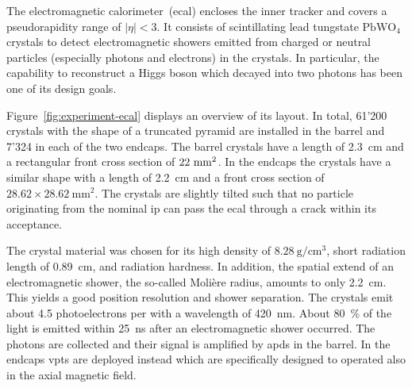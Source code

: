 The electromagnetic calorimeter~(\gls{ecal}) encloses the inner tracker and covers a pseudorapidity range of $|\eta|<3$. It consists of scintillating lead tungstate $\mathrm{PbWO}_{4}$ crystals to detect electromagnetic showers emitted from charged or neutral particles (especially photons and electrons) in the crystals. In particular, the capability to reconstruct a Higgs boson which decayed into two photons has been one of its design goals. 

Figure~\ref{fig:experiment-ecal} displays an overview of its layout. In total, 61'200 crystals with the shape of a truncated pyramid are installed in the barrel and 7'324 in each of the two endcaps. The barrel crystals have a length of 2.3~cm and a rectangular front cross section of $22\time22~\mathrm{mm}^{2}$. In the endcaps the crystals have a similar shape with a length of 2.2~cm and a front cross section of $28.62\times28.62~\mathrm{mm}^{2}$. The crystals are slightly tilted such that no particle originating from the nominal \gls{ip} can pass the \gls{ecal} through a crack within its acceptance.


The crystal material was chosen for its high density of $8.28~\mathrm{g}/\mathrm{cm}^{3}$, short radiation length of 0.89~cm, and radiation hardness. In addition, the spatial extend of an electromagnetic shower, the so-called Moli\`ere radius, amounts to only 2.2~cm. This yields a good position resolution and shower separation. The crystals emit about 4.5 photoelectrons per \MeV with a wavelength of 420~nm. About 80~\% of the light is emitted within 25~ns after an electromagnetic shower occurred. The photons are collected and their signal is amplified by \glspl{apd} in the barrel. In the endcaps \glspl{vpt} are deployed instead which are specifically designed to operated also in the axial magnetic field.

